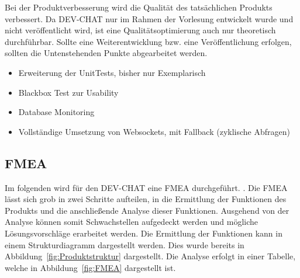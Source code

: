 \newparagraph
Bei der Produktverbesserung wird die Qualität des tatsächlichen Produkts verbessert.
Da DEV-CHAT nur im Rahmen der Vorlesung entwickelt wurde und nicht veröffentlicht wird, ist eine Qualitätsoptimierung auch nur theoretisch durchführbar. 
Sollte eine Weiterentwicklung bzw. eine Veröffentlichung erfolgen, sollten die Untenstehenden Punkte abgearbeitet werden.
\begin{itemize}
    \item Erweiterung der UnitTests, bisher nur Exemplarisch
    \item Blackbox Test zur Usability
    \item Database Monitoring
    \item Vollständige Umsetzung von Websockets, mit Fallback (zyklische Abfragen)
\end{itemize}

\subsection{\acl{FMEA}}
\label{sec:FMEA}
Im folgenden wird für den DEV-CHAT eine \ac{FMEA} durchgeführt.
 \autocite[][]{noauthor_fmea_nodate}.
\newparagraph
Die \ac{FMEA} lässt sich grob in zwei Schritte aufteilen, in die Ermittlung der Funktionen des Produkts und die anschließende Analyse dieser Funktionen.
Ausgehend von der Analyse können somit Schwachstellen aufgedeckt werden und mögliche Lösungsvorschläge erarbeitet werden.
Die Ermittlung der Funktionen kann in einem Strukturdiagramm dargestellt werden.
Dies wurde bereits in Abbildung~\ref{fig:Produktstruktur} dargestellt.
Die Analyse erfolgt in einer Tabelle, welche in Abbildung~\ref{fig:FMEA} dargestellt ist.






